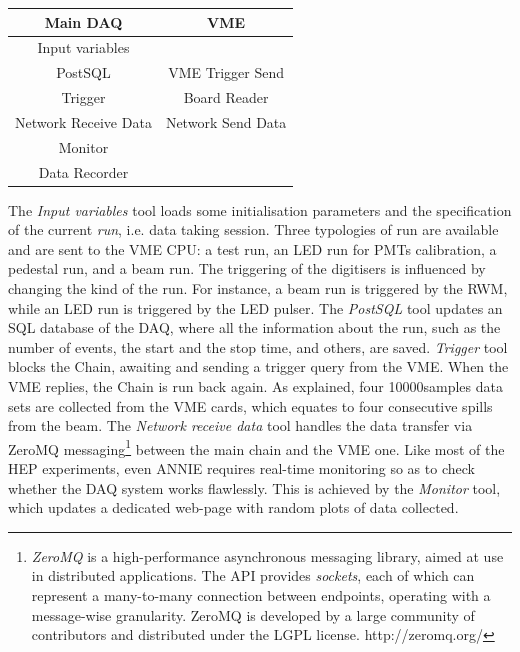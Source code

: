\begin{center}
  \small
  \begin{tabular}{cc}
    \toprule
    \textbf{Main DAQ}	& \textbf{VME}		\\
    \midrule
    Input variables 		&   \\
    PostSQL 			& VME Trigger Send   \\
    Trigger			& Board Reader	\\
    Network Receive Data	& Network Send Data	\\
    Monitor			& 	\\
    Data Recorder		& 	\\
    \bottomrule
  \end{tabular}
\end{center}

The \emph{Input variables} tool loads some initialisation parameters and the specification of %
the current \emph{run}, i.e. data taking session.
Three typologies of run are available and are sent to the VME CPU: a test run, an LED run for PMTs %
calibration, a pedestal run, and a beam run.
The triggering of the digitisers is influenced by changing the kind of the run.
For instance, a beam run is triggered by the RWM, while an LED run is triggered by the LED pulser.
The \emph{PostSQL} tool updates an SQL database of the DAQ, where all the information about %
the run, such as the number of events, the start and the stop time, and others, are saved.
\emph{Trigger} tool blocks the Chain, awaiting and sending a trigger query from the VME.
When the VME replies, the Chain is run back again.
As explained, four 10000samples data sets are collected from the VME cards, which equates to %
four consecutive spills from the beam.
The \emph{Network receive data} tool handles the data transfer via ZeroMQ %
messaging\footnote{\emph{ZeroMQ} %
  is a high-performance asynchronous messaging library, aimed at use in distributed applications.
  The API provides \emph{sockets}, each of which can represent a many-to-many connection %
  between endpoints, operating with a message-wise granularity.
  ZeroMQ is developed by a large community of contributors and distributed under the LGPL license.
  http://zeromq.org/} %
between the main chain and the VME one.
Like most of the HEP experiments, even ANNIE requires real-time monitoring so as to check whether %
the DAQ system works flawlessly.
This is achieved by the \emph{Monitor} tool, which updates a dedicated web-page with %
random plots of data collected.

